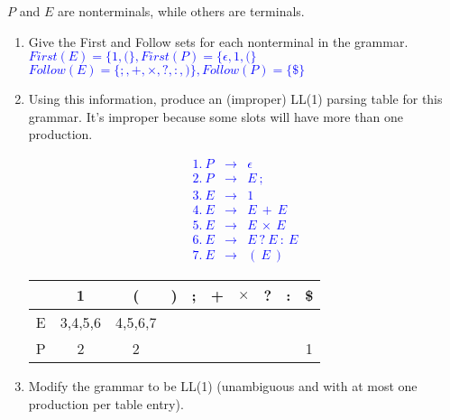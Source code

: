 \documentclass[10pt]{exam}
\begin{document}
\begin{enumerate}
        $P$ and $E$ are nonterminals, while others are terminals.
        \begin{enumerate}
          \item Give the First and Follow sets for each nonterminal in the grammar.\\
                \textcolor{blue}{
                  $First(E)=\{1,(\},First(P)=\{\epsilon,1,(\}$\\
                  $Follow(E)=\{;,+,\times,?,:,)\},Follow(P)=\{\$\}$
                }
          \item Using this information, produce an (improper) LL(1) parsing table for this grammar. It’s improper because
                some slots will have more than one production.\\
                \textcolor{blue}{\[\begin{array}{cll}
                      1.\  P & \rightarrow & \epsilon          \\
                      2.\  P & \rightarrow & E \ ;             \\
                      3.\  E & \rightarrow & 1                 \\
                      4.\  E & \rightarrow & E \ + \ E         \\
                      5.\  E & \rightarrow & E \ \times \ E    \\
                      6.\  E & \rightarrow & E \ ? \ E \ : \ E \\
                      7.\  E & \rightarrow & ( \ E \ )
                    \end{array}\]
                  \begin{tabular}{|c|c|c|c|c|c|c|c|c|c|}
                    \hline
                      & 1       & (       & ) & ; & + & $\times$ & ? & : & \$ \\
                    \hline
                    E & 3,4,5,6 & 4,5,6,7 &   &   &   &          &   &   &    \\
                    \hline
                    P & 2       & 2       &   &   &   &          &   &   & 1  \\
                    \hline
                  \end{tabular}
                }
          \item Modify the grammar to be LL(1) (unambiguous and with at most one production per
                table entry).\\
                \textcolor{blue}{
                  \[\begin{array}{cll}

\end{array}\]}
\end{enumerate}
\end{enumerate}
\end{document}
